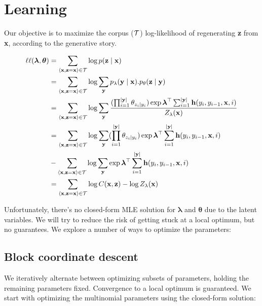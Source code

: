 \documentclass[11pt,onecolumn]{article}
\begin{document}
\section{Learning}

Our objective is to maximize the corpus ($\cal{T}$) log-likelihood of regenerating \textbf{z} from \textbf{x}, according to the generative story.

\begin{align}
\ell\ell(\boldsymbol{\lambda}, \boldsymbol{\theta}) &= \sum_{\langle\mathbf{x},\mathbf{z}=\mathbf{x}\rangle \in \cal{T}} \log p(\mathbf{z}\mid\mathbf{x}) \\
 &= \sum_{\langle\mathbf{x},\mathbf{z}=\mathbf{x}\rangle \in \cal{T}} \log \sum_{\mathbf{y}} p_\lambda(\mathbf{y}\mid\mathbf{x}).p_\theta(\mathbf{z}\mid\mathbf{y}) \\
 &= \sum_{\langle\mathbf{x},\mathbf{z}=\mathbf{x}\rangle \in \cal{T}} \log \sum_{\mathbf{y}} \frac{(\prod_{i=1}^{|\mathbf{y}|} \theta_{z_i\mid y_i}) \exp \boldsymbol{\lambda}^\top \sum_{i=1}^{|\mathbf{y}|} \mathbf{h}(y_i, y_{i-1}, \mathbf{x}, i)}{Z_\lambda(\mathbf{x})} \\
&= \sum_{\langle\mathbf{x},\mathbf{z}=\mathbf{x}\rangle \in \cal{T}} \log \sum_{\mathbf{y}} (\prod_{i=1}^{|\mathbf{y}|} \theta_{z_i\mid y_i}) \exp \boldsymbol{\lambda}^\top \sum_{i=1}^{|\mathbf{y}|} \mathbf{h}(y_i, y_{i-1}, \mathbf{x}, i) \nonumber \\
 &- \sum_{\langle\mathbf{x},\mathbf{z}=\mathbf{x}\rangle \in \cal{T}} \log \sum_{\mathbf{y}} \exp \boldsymbol{\lambda}^\top \sum_{i=1}^{|\mathbf{y}|} \mathbf{h}(y_i, y_{i-1}, \mathbf{x}, i) \\
&= \sum_{\langle\mathbf{x},\mathbf{z}=\mathbf{x}\rangle \in \cal{T}} \log C(\mathbf{x}, \mathbf{z}) - \log Z_\lambda(\mathbf{x})
\end{align}

Unfortunately, there's no closed-form MLE solution for $\boldsymbol{\lambda}$ and $\boldsymbol{\theta}$ due to the latent variables. We will try to reduce the risk of getting stuck at a local optimum, but no guarantees. We explore a number of ways to optimize the parameters:

\subsection{Block coordinate descent}

We iteratively alternate between optimizing subsets of parameters, holding the remaining parameters fixed. Convergence to a local optimum is guaranteed. We start with optimizing the multinomial parameters using the closed-form solution:
\end{document}
